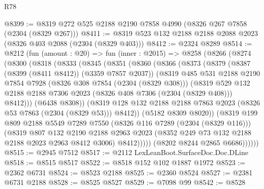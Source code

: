 \begin{lexlean}{R78}
\begin{coremodule}
@8399 := @8319 @272 @525 @2188 @2190 @7858 @4990 (@8326 @267 @7858 (@2304 (@8329 @267)))
@8411 := @8319 @523 @132 @2188 @2188 @2088 @2023 (@8326 @403 @2088 (@2304 (@8329 @403)))
@8412 := @2324 @8289
@8514 := @8212
    (fun (amount : @20) =>
    fun (inner : @2015) =>
    @8258
      (@8266
        (@8274
          (@8300
            (@8318
              (@8333
                (@8345
                  (@8351
                    (@8360
                      (@8366
                        (@8373
                          (@8379
                            (@8387 (@8399 (@8411 @8412)) (@3359 @7857 @2037))
                            (@8319
                              @485
                              @531
                              @2188
                              @2190
                              @7854
                              @7928
                              (@8326 @308 @7854 (@2304 (@8329 @308)))
                              (@8319
                                @529
                                @132
                                @2188
                                @2188
                                @7306
                                @2023
                                (@8326 @408 @7306 (@2304 (@8329 @408)))
                                @8412)))
                          (@6438 @8308))
                        (@8319
                          @128
                          @132
                          @2188
                          @2188
                          @7863
                          @2023
                          (@8326 @53 @7863 (@2304 (@8329 @53)))
                          @8412))
                      (@5182 @8309 @8020))
                    (@8319
                      @199
                      @809
                      @2188
                      @5549
                      @7289
                      @7550
                      (@8326 @116 @7289 (@2304 (@8329 @116)))
                      (@8319
                        @807
                        @132
                        @2190
                        @2188
                        @2963
                        @2023
                        (@8352 @249 @73 @132 @2188 @2188 @2023 @2963 @8412 @3006)
                        @8412)))))
              (@8202 @8244 @2865 @6686))))))
@8515 := @2945 @7512
@8517 := @2112 LexLeanBoot.SurfaceDoc.Doc.DLine
@8518 := @8515 @8517
@8522 := @8518 @152 @102 @1887 @1972
@8523 := @2362 @6731
@8524 := @8523 @2188
@8525 := @2360 @8524
@8527 := @2381 @6731 @2188
@8528 := @8525 @8527
@8529 := @7098 @99
@8542 := @8528

\end{coremodule}
\end{lexlean}
